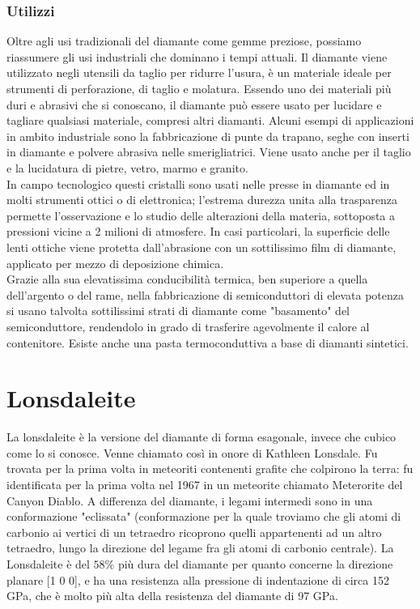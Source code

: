 \documentclass[a4paper,titlepage]{book}
\begin{document}
\subsection{Utilizzi}
Oltre agli usi tradizionali del diamante come gemme preziose, possiamo riassumere gli usi industriali che dominano i tempi attuali. Il diamante viene utilizzato negli utensili da taglio per ridurre l'usura, è un materiale ideale per strumenti di perforazione, di taglio e molatura. Essendo uno dei materiali più duri e abrasivi che si conoscano, il diamante può essere usato per lucidare e tagliare qualsiasi materiale, compresi altri diamanti. Alcuni esempi di applicazioni in ambito industriale sono la fabbricazione di punte da trapano, seghe con inserti in diamante e polvere abrasiva nelle smerigliatrici. Viene usato anche per il taglio e la lucidatura di pietre, vetro, marmo e granito. \\
In campo tecnologico questi cristalli sono usati nelle presse in diamante ed in molti strumenti ottici o di elettronica; l'estrema durezza unita alla trasparenza permette l'osservazione e lo studio delle alterazioni della materia, sottoposta a pressioni vicine a 2 milioni di atmosfere. In casi particolari, la superficie delle lenti ottiche viene protetta dall'abrasione con un sottilissimo film di diamante, applicato per mezzo di deposizione chimica. \\
Grazie alla sua elevatissima conducibilità termica, ben superiore a quella dell'argento o del rame, nella fabbricazione di semiconduttori di elevata potenza si usano talvolta sottilissimi strati di diamante come "basamento" del semiconduttore, rendendolo in grado di trasferire agevolmente il calore al contenitore. Esiste anche una pasta termoconduttiva a base di diamanti sintetici.

\chapter{Lonsdaleite}
La lonsdaleite è la versione del diamante di forma esagonale, invece che cubico come lo si conosce. Venne chiamato così in onore di Kathleen Lonsdale. Fu trovata per la prima volta in meteoriti contenenti grafite che colpirono la terra: fu identificata per la prima volta nel 1967 in un meteorite chiamato Meterorite del Canyon Diablo. A differenza del diamante, i legami intermedi sono in una conformazione "eclissata" (conformazione per la quale troviamo che gli atomi di carbonio ai vertici di un tetraedro ricoprono quelli appartenenti ad un altro tetraedro, lungo la direzione del legame fra gli atomi di carbonio centrale). La Lonsdaleite è del $58\%$ più dura del diamante per quanto concerne la direzione planare [1 0 0], e ha una resistenza alla pressione di indentazione di circa 152 GPa, che è molto più alta della resistenza del diamante di 97 GPa. 
\end{document}
